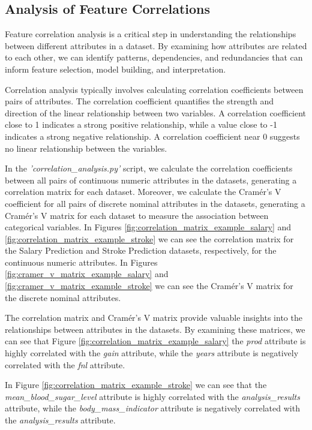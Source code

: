 \documentclass[runningheads]{paper}
\begin{document}
\subsection{Analysis of Feature Correlations}
Feature correlation analysis is a critical step in understanding the relationships
between different attributes in a dataset. By examining how attributes are related
to each other, we can identify patterns, dependencies, and redundancies that can
inform feature selection, model building, and interpretation.

Correlation analysis typically involves calculating correlation coefficients
between pairs of attributes. The correlation coefficient quantifies the strength
and direction of the linear relationship between two variables. A correlation
coefficient close to 1 indicates a strong positive relationship, while a value
close to -1 indicates a strong negative relationship. A correlation coefficient
near 0 suggests no linear relationship between the variables.

In the \textit{'correlation\_analysis.py'} script, we calculate the correlation
coefficients between all pairs of continuous numeric attributes in the datasets,
generating a correlation matrix for each dataset. Moreover, we calculate the 
Cramér's V coefficient for all pairs of discrete nominal attributes in the datasets,
generating a Cramér's V matrix for each dataset to measure the association between
categorical variables. In Figures \ref{fig:correlation_matrix_example_salary} and
\ref{fig:correlation_matrix_example_stroke} we can see the correlation matrix for
the Salary Prediction and Stroke Prediction datasets, respectively, for the continuous
numeric attributes. In Figures \ref{fig:cramer_v_matrix_example_salary} and
\ref{fig:cramer_v_matrix_example_stroke} we can see the Cramér's V matrix for
the discrete nominal attributes.

The correlation matrix and Cramér's V matrix provide valuable insights into the
relationships between attributes in the datasets. By examining these matrices, we
can see that Figure \ref{fig:correlation_matrix_example_salary} the \textit{prod}
attribute is highly correlated with the \textit{gain} attribute, while the
\textit{years} attribute is negatively correlated with the \textit{fnl} attribute.

In Figure \ref{fig:correlation_matrix_example_stroke} we can see that the
\textit{mean\_blood\_sugar\_level} attribute is highly correlated with the
\textit{analysis\_results} attribute, while the \textit{body\_mass\_indicator} 
attribute is negatively correlated with the \textit{analysis\_results} attribute.
\end{document}
